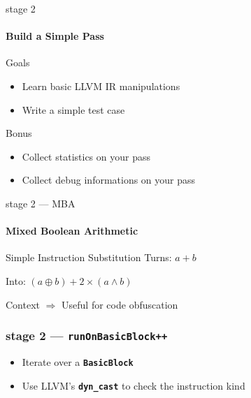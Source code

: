 \documentclass[14pt]{beamer}
\newcommand{\Code}[1]{\textbf{\texttt{#1}}}
\begin{document}
    \begin{frame}{stage 2}

        \framesubtitle{Build a Simple Pass}

        \begin{block}{Goals}
            \begin{itemize}
                \item Learn basic LLVM IR manipulations
                \item Write a simple test case
            \end{itemize}

        \end{block}

        \begin{alertblock}{Bonus}
            \begin{itemize}
                \item Collect statistics on your pass
                \item Collect debug informations on your pass
            \end{itemize}
        \end{alertblock}

    \end{frame}

    \begin{frame}{stage 2 --- MBA}
        \framesubtitle{Mixed Boolean Arithmetic}

        \begin{alertblock}{Simple Instruction Substitution}
            Turns: $a + b$

            Into: $(a \oplus b) + 2 \times (a \wedge b)$
        \end{alertblock}

        \begin{block}{Context}
            \alert{$\Rightarrow$} Useful for code obfuscation
        \end{block}

    \end{frame}

    \begin{frame}[containsverbatim]
    \frametitle{stage 2 --- \texttt{runOnBasicBlock++}}
    \begin{itemize}
        \item Iterate over a \Code{BasicBlock}
        \item Use LLVM's \Code{dyn\_cast} to check the instruction kind
    \end{itemize}
	\hspace{-1em}
    \begin{minipage}{\textwidth}
        \footnotesize
        
    \end{minipage}
    \end{frame}
\end{document}
